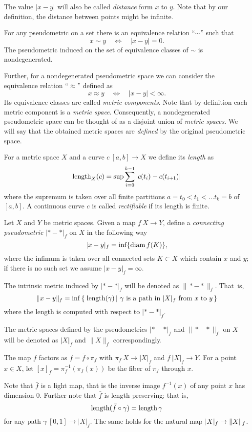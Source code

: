 \documentclass{article}
\begin{document}
The value $|x-y|$ will also be called \emph{distance} form $x$ to $y$.
Note that by our definition, the distance between points might be infinite.

For any pseudometric on a set there is an equivalence relation ``$\sim$'' such that 
\[x\sim y\quad\iff\quad|x-y|=0.\]
The pseudometric induced  on the set of equivalence classes of $\sim$ is nondegenerated.

Further, for a nondegenerated pseudometric space we can consider the equivalence relation ``$\approx$'' defined as 
\[x\approx y\quad\iff\quad|x-y|<\infty.\]
Its equivalence classes are called \emph{metric components}.
Note that by definition each metric component is a \emph{metric space}.
Consequently, a nondegenerated pseudometric space can be thought of as a disjoint union of \emph{metric spaces}.
We will say that the obtained metric spaces are \emph{defined} by the  original pseudometric space.%

For a metric space $X$ and a curve $c\:[a,b]\to X$ we define its {\em length} as
\[\mathop{\rm length}\nolimits_X(c)=\sup\sum_{i=0}^{k-1} |c(t_i)-c(t_{i+1})|\]
where the supremum is taken over all finite partitions ${a=t_0<t_1<\ldots t_k=b}$ of $[a,b]$. 
A continuous curve $c$ is called {\em rectifiable} if its length is finite.

Let $X$ and $Y$ be metric spaces.
Given a map $f\:X\to Y$,
define a \emph{connecting pseudometric} $|{*}-{*}|_f$ on $X$ in
the following way
\[|x-y|_f=\inf\{\mathop{\rm diam}\nolimits f(K)\},\]
where the infimum is taken over all connected sets $K\subset X$ which contain $x$ and $y$;
if there is no such set we assume $|x-y|_f=\infty$.

The intrinsic metric induced by $|{*}-{*}|_f$ will be denoted as 
$\|{*}-{*}\|_f$. 
That~is, 
\[\|x-y\|_f=\inf\set{\length(\gamma)}{\gamma\ \text{is a path in}\ |X|_f\ \text{from}\ x \ \text{to}\ y}\]
where the length is computed with respect to $|{*}-{*}|_f$.

The metric spaces defined by the pseudometrics $|{*}-{*}|_f$ 
and $\|{*}-{*}\|_f$ on $X$ will be denoted as $|X|_f$ and $\|X\|_f$ correspondingly.

\medskip

The map $f$ factors as $f=\bar f\circ \pi_f$ with $\pi_f\:X\to|X|_f$ and $\bar f\:|X|_f\to Y$.
For a point $x\in X$, let $[x]_f=\pi_f^{-1}(\pi_f(x))$ be the fiber of $\pi_f$ through $x$.

Note that $\bar f$ is a light map,
that is the inverse image $f^{-1}(x)$ of any point $x$ has dimension $0$.
Further note that $\bar f$
is length preserving;
that is,
\[\mathop{\rm length}\nolimits(\bar f\circ\gamma)=\mathop{\rm length}\nolimits\gamma\]
for any path $\gamma\:[0,1]\to |X|_f$.
The same holds for the natural map $|X|_f\zz\to \|X\|_f$.
\end{document}
